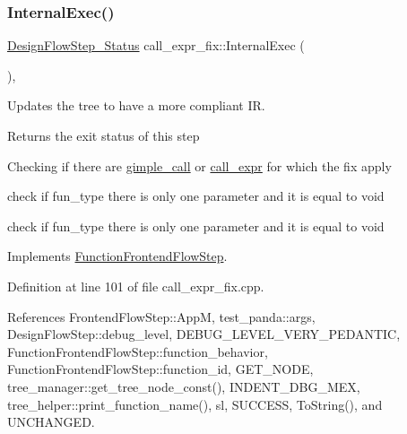 \mbox{\label{classcall__expr__fix_a4aa8f0db73ae82fe5de110e96185355e}} 
\subsubsection{\texorpdfstring{Internal\+Exec()}{InternalExec()}}
{\footnotesize\ttfamily \hyperlink{design__flow__step_8hpp_afb1f0d73069c26076b8d31dbc8ebecdf}{Design\+Flow\+Step\+\_\+\+Status} call\+\_\+expr\+\_\+fix\+::\+Internal\+Exec (\begin{DoxyParamCaption}{ }\end{DoxyParamCaption})\hspace{0.3cm}{\ttfamily [override]}, {\ttfamily [virtual]}}



Updates the tree to have a more compliant IR. 

\begin{DoxyReturn}{Returns}
the exit status of this step 
\end{DoxyReturn}
Checking if there are \hyperlink{structgimple__call}{gimple\+\_\+call} or \hyperlink{structcall__expr}{call\+\_\+expr} for which the fix apply

check if fun\+\_\+type there is only one parameter and it is equal to void

check if fun\+\_\+type there is only one parameter and it is equal to void 

Implements \hyperlink{classFunctionFrontendFlowStep_a00612f7fb9eabbbc8ee7e39d34e5ac68}{Function\+Frontend\+Flow\+Step}.



Definition at line 101 of file call\+\_\+expr\+\_\+fix.\+cpp.



References Frontend\+Flow\+Step\+::\+AppM, test\+\_\+panda\+::args, Design\+Flow\+Step\+::debug\+\_\+level, D\+E\+B\+U\+G\+\_\+\+L\+E\+V\+E\+L\+\_\+\+V\+E\+R\+Y\+\_\+\+P\+E\+D\+A\+N\+T\+IC, Function\+Frontend\+Flow\+Step\+::function\+\_\+behavior, Function\+Frontend\+Flow\+Step\+::function\+\_\+id, G\+E\+T\+\_\+\+N\+O\+DE, tree\+\_\+manager\+::get\+\_\+tree\+\_\+node\+\_\+const(), I\+N\+D\+E\+N\+T\+\_\+\+D\+B\+G\+\_\+\+M\+EX, tree\+\_\+helper\+::print\+\_\+function\+\_\+name(), sl, S\+U\+C\+C\+E\+SS, To\+String(), and U\+N\+C\+H\+A\+N\+G\+ED.

